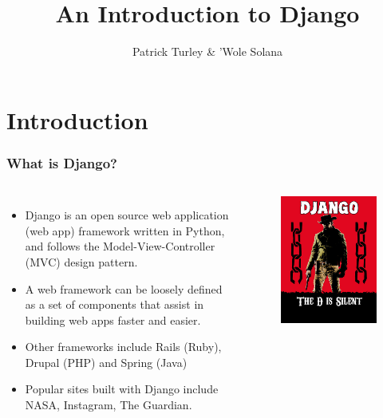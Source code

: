 \documentclass[10pt,t,xcolor=dvipsnames]{beamer}
\title{ An Introduction to Django }
\author{ Patrick Turley \& 'Wole Solana }
\begin{document}
\nocite*{}
\frame [c, plain]{\titlepage}
\section{Introduction}
\begin{frame}
\frametitle{What is Django?}
\pause
\begin{columns}[l]
\begin{itemize}[<+->]
\item \alert{Django} is an open source web application (web app) framework written in Python, and follows the \alert{Model-View-Controller} (MVC) design pattern.
\item A \alert{web framework} can be loosely defined as a set of components that assist in building web apps faster and easier.
\item Other frameworks include Rails (Ruby), Drupal (PHP) and Spring (Java)
\item Popular sites built with Django include NASA, Instagram, The Guardian.
\end{itemize}
\begin{figure}
\centering
\includegraphics[scale=0.3]{../images/django.jpg} 
\end{figure}
\end{columns}
\end{frame}
\end{document}
